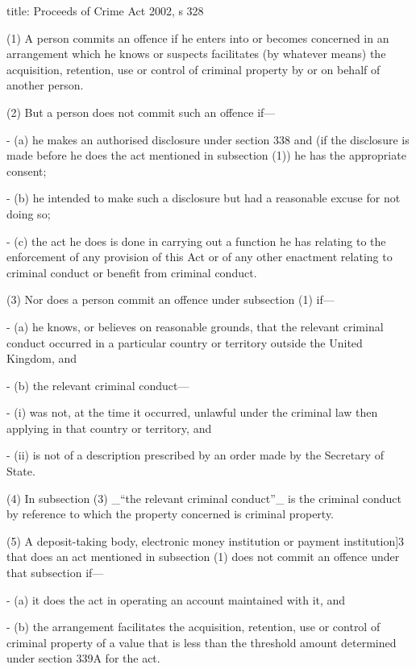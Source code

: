 \documentclass[
]{article}
\newenvironment{Shaded}{}{}
\newcommand{\NormalTok}[1]{#1}
\begin{document}
\begin{Shaded}
\begin{Highlighting}[]
\NormalTok{title: Proceeds of Crime Act 2002, s 328}

\NormalTok{(1) A person commits an offence if he enters into or becomes concerned in an arrangement which he knows or suspects facilitates (by whatever means) the acquisition, retention, use or control of criminal property by or on behalf of another person.}

\NormalTok{(2) But a person does not commit such an offence if—}

\NormalTok{{-} (a) he makes an authorised disclosure under section 338 and (if the disclosure is made before he does the act mentioned in subsection (1)) he has the appropriate consent;}

\NormalTok{{-} (b) he intended to make such a disclosure but had a reasonable excuse for not doing so;}

\NormalTok{{-} (c) the act he does is done in carrying out a function he has relating to the enforcement of any provision of this Act or of any other enactment relating to criminal conduct or benefit from criminal conduct.}

\NormalTok{(3) Nor does a person commit an offence under subsection (1) if—}

\NormalTok{{-} (a) he knows, or believes on reasonable grounds, that the relevant criminal conduct occurred in a particular country or territory outside the United Kingdom, and}

\NormalTok{{-} (b) the relevant criminal conduct—}

\NormalTok{    {-} (i) was not, at the time it occurred, unlawful under the criminal law then applying in that country or territory, and}
    
\NormalTok{    {-} (ii) is not of a description prescribed by an order made by the Secretary of State.}

\NormalTok{(4) In subsection (3) \_“the relevant criminal conduct”\_ is the criminal conduct by reference to which the property concerned is criminal property.}

\NormalTok{(5) A deposit{-}taking body, electronic money institution or payment institution]3 that does an act mentioned in subsection (1) does not commit an offence under that subsection if—}

\NormalTok{{-} (a) it does the act in operating an account maintained with it, and}

\NormalTok{{-} (b) the arrangement facilitates the acquisition, retention, use or control of criminal property of a value that is less than the threshold amount determined under section 339A for the act.}
\end{Highlighting}
\end{Shaded}
\end{document}
